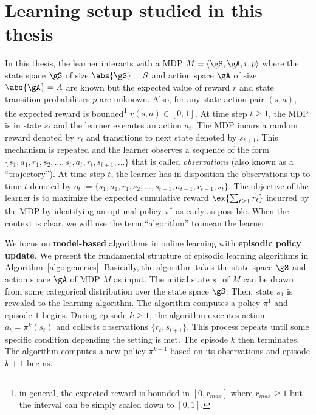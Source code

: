 
\section{Learning setup studied in this thesis}
\label{sec:intro_learning}

In this thesis, the learner interacts with a MDP $M=\langle\gS,\gA,r,p\rangle$ where the state space $\gS$ of size $\abs{\gS}=S$ and action space $\gA$ of size $\abs{\gA}=A$ are known but the expected value of reward $r$ and state transition probabilities $p$ are unknown.
Also, for any state-action pair $(s,a)$, the expected reward is bounded\footnote{in general, the expected reward is bounded in $[0, r_{max}]$ where $r_{max}\ge1$ but the interval can be simply scaled down to $[0,1]$.} $r(s,a)\in[0,1]$.
At time step $t\ge1$, the MDP is in state $s_t$ and the learner executes an action $a_t$.
The MDP incurs a random reward denoted by $r_t$ and transitions to next state denoted by $s_{t+1}$.
This mechanism is repeated and the learner observes a sequence of the form $\{s_1,a_1,r_1,s_2,\dots,s_t,a_t,r_t,s_{t+1},\dots\}$ that is called \emph{observations} (also known as a ``trajectory'').
At time step $t$, the learner has in disposition the observations up to time $t$ denoted by $o_t:=\{s_1,a_1,r_1,s_2,\dots,s_{t-1},a_{t-1},r_{t-1},s_{t}\}$.
The objective of the learner is to maximize the expected cumulative reward $\ex{\sum_{t\ge1}r_t}$ incurred by the MDP by identifying an optimal policy $\pi^*$ as early as possible.
When the context is clear, we will use the term ``algorithm'' to mean the learner.

We focus on \textbf{model-based} algorithms in online learning with \textbf{episodic policy update}.
We present the fundamental structure of episodic learning algorithms in Algorithm~\ref{algo:generics}.
Basically, the algorithm takes the state space $\gS$ and action space $\gA$ of MDP $M$ as input.
The initial state $s_1$ of $M$ can be drawn from some categorical distribution over the state space $\gS$.
Then, state $s_1$ is revealed to the learning algorithm.
The algorithm computes a policy $\pi^1$ and episode $1$ begins.
During episode $k\ge1$, the algorithm executes action $a_t=\pi^k(s_t)$ and collects observations $\{r_t, s_{t+1}\}$.
This process repeats until some specific condition depending the setting is met.
The episode $k$ then terminates.
The algorithm computes a new policy $\pi^{k+1}$ based on its observations and episode $k+1$ begins.

